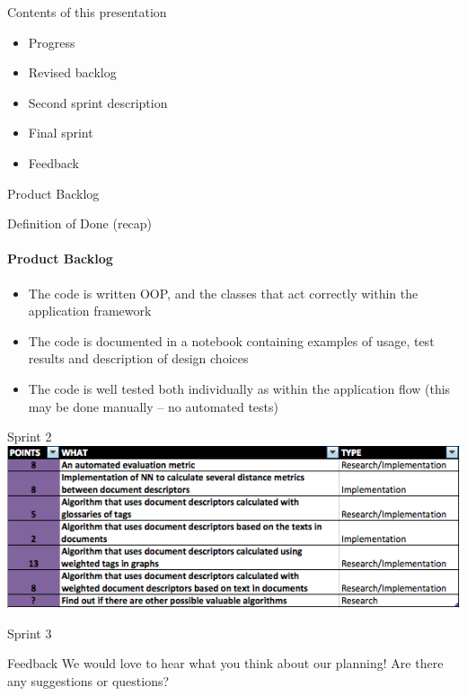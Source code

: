
\begin{frame}[t,plain]
\titlepage
\end{frame}

\begin{frame}[t]{Contents of this presentation}
\begin{itemize}
	\item Progress
	\item Revised backlog
	\item Second sprint description 
	\item Final sprint 
	\item Feedback
\end{itemize}
\end{frame}



\begin{frame}[t]{Product Backlog}
\end{frame}

\begin{frame}[t]{Definition of Done (recap)}
\framesubtitle{Product Backlog}

\begin{itemize}
	\item  The code is written OOP, and the classes that act correctly within the application framework
	\item The code is documented in a notebook containing examples of usage, test results and description of design choices 
	\item The code is well tested both individually as within the application flow (this may be done manually – no automated tests)
\end{itemize}
\end{frame}

\begin{frame}[t]{Sprint 2}
\includegraphics[width=\linewidth]{sprintt}
\end{frame}

\begin{frame}[t]{Sprint 3}

\end{frame}

\begin{frame}[t]{Feedback}
We would love to hear what you think about our planning! Are there any suggestions or questions?
\end{frame}
